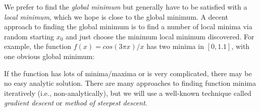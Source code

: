 \begin{fullwidth}
We prefer to find the {\em global minimum} but generally have to be satisfied with a {\em local minimum}, which we hope is close to the global minimum. A decent approach to finding the global minimum is to find a number of local minima via random starting $x_0$ and just choose the minimum local minimum discovered. For example, the function $f(x) = cos(3\pi x) / x$ has two minima in $[0,1.1]$, with one obvious global minimum:


If the function has lots of minima/maxima or is very complicated, there may be no easy analytic solution.
There are many approaches to finding function minima iteratively (i.e., non-analytically), but we will use a well-known technique called {\em gradient descent} or {\em method of steepest descent}.  


\end{fullwidth}

